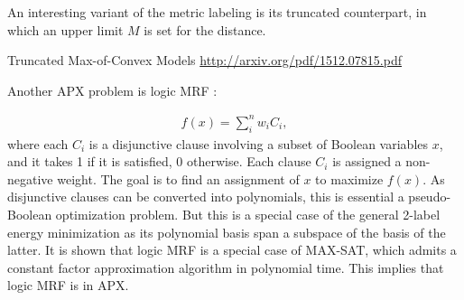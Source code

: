 
An interesting variant of the metric labeling is its truncated counterpart, in which an upper limit $M$ is set for the distance.  
\par \revisit Truncated Max-of-Convex Models \url{http://arxiv.org/pdf/1512.07815.pdf}
\par {}
\cite{Kumar-11-improved}

Another APX problem is logic MRF \cite{bach2015unifying}:

\begin{align}
    f(x) = \sum_i^n w_iC_i,
\end{align}
where each $C_i$ is a disjunctive clause involving a subset of Boolean variables $x$, and it takes 1 if it is satisfied, 0 otherwise. Each clause $C_i$ is assigned a non-negative weight. The goal is to find an assignment of $x$ to maximize $f(x)$. As disjunctive clauses can be converted into polynomials, this is essential a pseudo-Boolean optimization problem. But this is a special case of the general 2-label energy minimization as its polynomial basis span a subspace of the basis of the latter. It is shown that logic MRF is a special case of MAX-SAT, which admits a constant factor approximation algorithm in polynomial time. This implies that logic MRF is in APX. 


